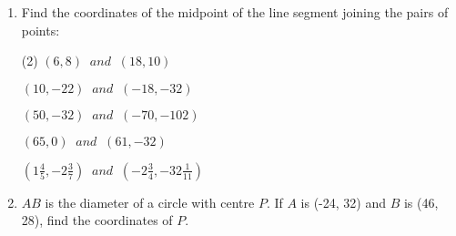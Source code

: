 \begin{enumerate} [leftmargin=0cm] 



\clearpage

\item Find the coordinates of the midpoint of the line segment joining the pairs of points:
\begin{tasks}[label=(\arabic*), after-item-skip=2pt,after-skip=3pt, label-width=4ex](2)
    \task  $ (6, 8) \;\; and \;\;(18, 10) $  \\
	    \begin{envAnswer} {
		}\end{envAnswer}
		   
    \task  $ (10, -22) \;\; and \;\;(-18, -32) $  \\
	    \begin{envAnswer}[3] {
        } \end{envAnswer}

    \task  $ (50, -32) \;\; and \;\;(-70, -102) $  \\
	    \begin{envAnswer}[3] {   
        }\end{envAnswer}


    \task  $ (65, 0) \;\; and \;\;(61, -32) $  \\
	    \begin{envAnswer}[3]{  
		} \end{envAnswer}


    \task  $ (1\frac{4}{5}, -2\frac{3}{7}) \;\; and \;\;(-2\frac{3}{4}, -32\frac{1}{11}) $  \\
	    \begin{envAnswer}[3]{  
		} \end{envAnswer}

\end{tasks}




\item $AB$ is the diameter of a circle with centre $P$. If $A$ is (-24, 32) and $B$ is (46, 28), find the coordinates
of $P$. \\

	    \begin{envAnswer}[3] {
        } \end{envAnswer}

\clearpage

\end{enumerate} 
